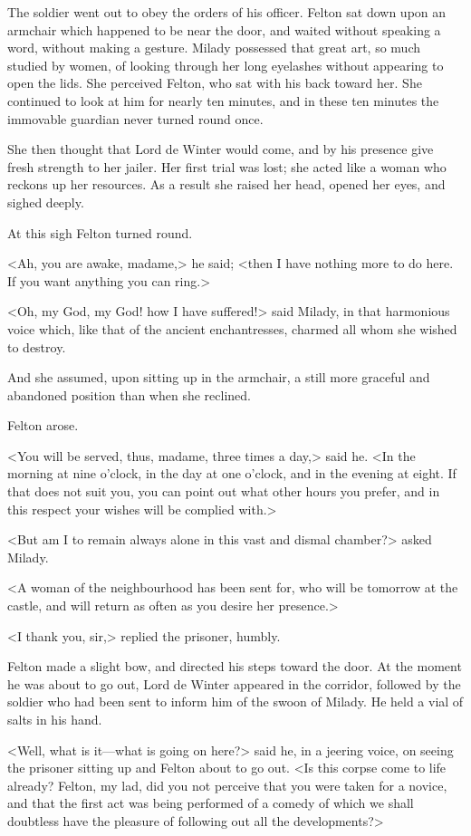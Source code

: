 The soldier went out to obey the orders of his officer. Felton sat down upon an armchair which happened to be near the door, and waited without speaking a word, without making a gesture. Milady possessed that great art, so much studied by women, of looking through her long eyelashes without appearing to open the lids. She perceived Felton, who sat with his back toward her. She continued to look at him for nearly ten minutes, and in these ten minutes the immovable guardian never turned round once. 

She then thought that Lord de Winter would come, and by his presence give fresh strength to her jailer. Her first trial was lost; she acted like a woman who reckons up her resources. As a result she raised her head, opened her eyes, and sighed deeply. 

At this sigh Felton turned round. 

<Ah, you are awake, madame,> he said; <then I have nothing more to do here. If you want anything you can ring.> 

<Oh, my God, my God! how I have suffered!> said Milady, in that harmonious voice which, like that of the ancient enchantresses, charmed all whom she wished to destroy. 

And she assumed, upon sitting up in the armchair, a still more graceful and abandoned position than when she reclined. 

Felton arose. 

<You will be served, thus, madame, three times a day,> said he. <In the morning at nine o'clock, in the day at one o'clock, and in the evening at eight. If that does not suit you, you can point out what other hours you prefer, and in this respect your wishes will be complied with.> 

<But am I to remain always alone in this vast and dismal chamber?> asked Milady. 

<A woman of the neighbourhood has been sent for, who will be tomorrow at the castle, and will return as often as you desire her presence.> 

<I thank you, sir,> replied the prisoner, humbly. 

Felton made a slight bow, and directed his steps toward the door. At the moment he was about to go out, Lord de Winter appeared in the corridor, followed by the soldier who had been sent to inform him of the swoon of Milady. He held a vial of salts in his hand. 

<Well, what is it---what is going on here?> said he, in a jeering voice, on seeing the prisoner sitting up and Felton about to go out. <Is this corpse come to life already? Felton, my lad, did you not perceive that you were taken for a novice, and that the first act was being performed of a comedy of which we shall doubtless have the pleasure of following out all the developments?> 

